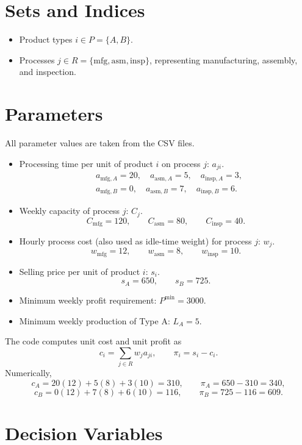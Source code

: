 \section*{Sets and Indices}

\begin{itemize}
    \item Product types \(i \in P = \{A,B\}\).
    \item Processes \(j \in R = \{\mathrm{mfg},\mathrm{asm},\mathrm{insp}\}\), representing manufacturing, assembly, and inspection.
\end{itemize}

\section*{Parameters}

All parameter values are taken from the CSV files.

\begin{itemize}
    \item Processing time per unit of product \(i\) on process \(j\): \(a_{ji}\).
    \[
    \begin{aligned}
    &a_{\mathrm{mfg},A}=20,\quad a_{\mathrm{asm},A}=5,\quad a_{\mathrm{insp},A}=3,\\
    &a_{\mathrm{mfg},B}=0,\quad a_{\mathrm{asm},B}=7,\quad a_{\mathrm{insp},B}=6.
    \end{aligned}
    \]
    \item Weekly capacity of process \(j\): \(C_j\).
    \[
    C_{\mathrm{mfg}}=120,\qquad C_{\mathrm{asm}}=80,\qquad C_{\mathrm{insp}}=40.
    \]
    \item Hourly process cost (also used as idle-time weight) for process \(j\): \(w_j\).
    \[
    w_{\mathrm{mfg}}=12,\qquad w_{\mathrm{asm}}=8,\qquad w_{\mathrm{insp}}=10.
    \]
    \item Selling price per unit of product \(i\): \(s_i\).
    \[
    s_A=650,\qquad s_B=725.
    \]
    \item Minimum weekly profit requirement: \(P^{\min}=3000\).
    \item Minimum weekly production of Type A: \(L_A=5\).
\end{itemize}

The code computes unit cost and unit profit as
\[
c_i=\sum_{j\in R} w_j a_{ji},\qquad \pi_i=s_i-c_i.
\]
Numerically,
\[
c_A=20(12)+5(8)+3(10)=310,\qquad \pi_A=650-310=340,
\]
\[
c_B=0(12)+7(8)+6(10)=116,\qquad \pi_B=725-116=609.
\]

\section*{Decision Variables}

